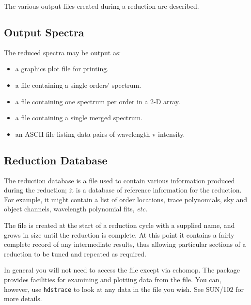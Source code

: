 \documentclass[11pt,twoside]{article}
\newcommand{\xref}[3]{#1}
\newcommand{\xlabel}[1]{}
\newcommand{\mlabel}[1]{\xlabel{#1}\label{#1}}
\begin{document}
The various output files created during a reduction are described.

\subsection{\mlabel{output_spectra}Output Spectra}

The reduced spectra may be output as:

\begin{itemize}

\item a graphics plot file for printing.

\item a file containing a single orders' spectrum.

\item a file containing one spectrum per order in a 2-D array.

\item a file containing a single merged spectrum.

\item an ASCII file listing data pairs of wavelength v intensity.


\end{itemize}

\subsection{Reduction Database}

The reduction database is a file used to contain
various information produced during the reduction; it is a database of
reference information for the reduction.
For example, it might contain a list of order locations,
trace polynomials, sky and object channels, wavelength polynomial fits,
{\it etc.}

The file is created at the start of a reduction cycle with a supplied name,
and grows in size until the reduction is complete.
At this point it contains a fairly complete record of any intermediate
results, thus allowing particular sections of a reduction to be tuned
and repeated as required.

In general you will not need to access the file except via {\sc echomop}.
The package provides facilities for examining and plotting data from the file.
You can, however, use \texttt{hdstrace} to look at any data in the file you wish.
See \xref{SUN/102}{sun102}{} for more details.


\end{document}
